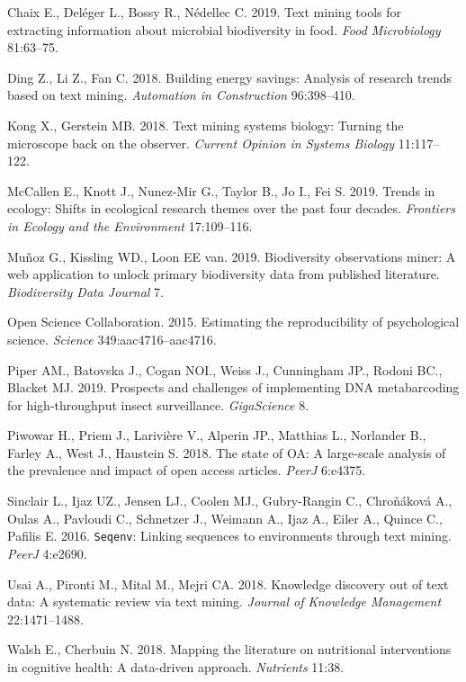 \documentclass[author-year, review, 11pt]{components/elsarticle} %
\begin{document}
\leavevmode\hypertarget{ref-Chaix2019}{}%
Chaix E., Deléger L., Bossy R., Nédellec C. 2019. Text mining tools for
extracting information about microbial biodiversity in food. \emph{Food
Microbiology} 81:63--75.

\leavevmode\hypertarget{ref-Ding2018}{}%
Ding Z., Li Z., Fan C. 2018. Building energy savings: Analysis of
research trends based on text mining. \emph{Automation in Construction}
96:398--410.

\leavevmode\hypertarget{ref-Kong2018}{}%
Kong X., Gerstein MB. 2018. Text mining systems biology: Turning the
microscope back on the observer. \emph{Current Opinion in Systems
Biology} 11:117--122.

\leavevmode\hypertarget{ref-McCallen2019}{}%
McCallen E., Knott J., Nunez-Mir G., Taylor B., Jo I., Fei S. 2019.
Trends in ecology: Shifts in ecological research themes over the past
four decades. \emph{Frontiers in Ecology and the Environment}
17:109--116.

\leavevmode\hypertarget{ref-Munoz2019}{}%
Muñoz G., Kissling WD., Loon EE van. 2019. Biodiversity observations
miner: A web application to unlock primary biodiversity data from
published literature. \emph{Biodiversity Data Journal} 7.

\leavevmode\hypertarget{ref-OSC2015}{}%
Open Science Collaboration. 2015. Estimating the reproducibility of
psychological science. \emph{Science} 349:aac4716--aac4716.

\leavevmode\hypertarget{ref-Piper2019}{}%
Piper AM., Batovska J., Cogan NOI., Weiss J., Cunningham JP., Rodoni
BC., Blacket MJ. 2019. Prospects and challenges of implementing DNA
metabarcoding for high-throughput insect surveillance.
\emph{GigaScience} 8.

\leavevmode\hypertarget{ref-Piwowar2018}{}%
Piwowar H., Priem J., Larivière V., Alperin JP., Matthias L., Norlander
B., Farley A., West J., Haustein S. 2018. The state of OA: A large-scale
analysis of the prevalence and impact of open access articles.
\emph{PeerJ} 6:e4375.

\leavevmode\hypertarget{ref-Sinclair2016}{}%
Sinclair L., Ijaz UZ., Jensen LJ., Coolen MJ., Gubry-Rangin C.,
Chroňáková A., Oulas A., Pavloudi C., Schnetzer J., Weimann A., Ijaz A.,
Eiler A., Quince C., Pafilis E. 2016. \texttt{Seqenv}: Linking sequences
to environments through text mining. \emph{PeerJ} 4:e2690.

\leavevmode\hypertarget{ref-Usai2018}{}%
Usai A., Pironti M., Mital M., Mejri CA. 2018. Knowledge discovery out
of text data: A systematic review via text mining. \emph{Journal of
Knowledge Management} 22:1471--1488.

\leavevmode\hypertarget{ref-Walsh2018}{}%
Walsh E., Cherbuin N. 2018. Mapping the literature on nutritional
interventions in cognitive health: A data-driven approach.
\emph{Nutrients} 11:38.
\end{document}
